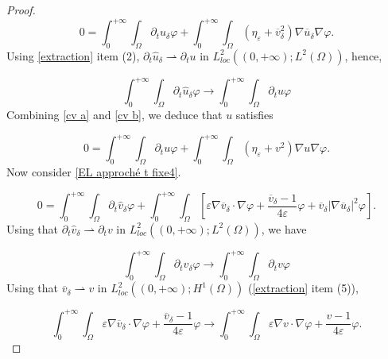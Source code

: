 \documentclass[reqno,12pt,twoside]{amsart}
\numberwithin{equation}{section} \numberwithin{theorem}{section}
\numberwithin{proposition}{section} \numberwithin{lemma}{section}
\numberwithin{corollary}{section}
\numberwithin{definition}{section} \numberwithin{remark}{section}
\begin{document}
\begin{proof}
\[0 =\int_0^{+\infty} \int_\Omega \partial_t \hat{u}_\delta \varphi + \int_0^{+\infty}\int_\Omega (\eta_\varepsilon + \overline{v}_\delta ^2) \nabla \overline{u}_\delta \nabla \varphi.\]
Using \autoref{extraction} item (2), $\partial_t \hat{u}_\delta \rightharpoonup \partial_t u$ in $L_{loc}^2((0,+\infty);L^2(\Omega))$, hence,

\begin{equation}\label{cv a}
\int_0^{+\infty} \int_\Omega \partial_t \hat{u}_\delta \varphi \rightarrow \int_0^{+\infty} \int_\Omega \partial_t u \varphi
\end{equation}
Combining \eqref{cv a} and \eqref{cv b}, we deduce that $u$ satisfies 

\begin{equation}\label{cv 1}
0 = \int_0^{+\infty} \int_\Omega \partial_t u \varphi + \int_0^{+\infty}\int_\Omega (\eta_\varepsilon + v ^2) \nabla u \nabla \varphi.
\end{equation}
Now consider \eqref{EL approché t fixe4}.

\[0 = \int_0^{+\infty} \int_\Omega \partial_t \hat{v}_\delta \varphi + \int_0^{+\infty} \int_\Omega \left[\varepsilon \nabla \overline{v}_\delta \cdot \nabla \varphi + \frac{\overline{v}_\delta -1}{4\varepsilon} \varphi + \overline{v}_\delta |\nabla \overline{u}_\delta |^2 \varphi\right].\]
Using that $ \partial_t \hat{v}_\delta \rightharpoonup \partial_t v$ in $L_{loc}^2((0,+\infty);L^2(\Omega))$, we have 

\begin{equation}\label{cv c}
\int_0^{+\infty} \int_\Omega \partial_t \hat{v}_\delta \varphi \rightarrow \int_0^{+\infty} \int_\Omega \partial_t v \varphi
\end{equation}
Using that  $\overline{v}_\delta \rightharpoonup  v$ in $L_{loc}^2((0,+\infty);H^1(\Omega))$ (\autoref{extraction} item (5)), 

\begin{equation}\label{cv d}
\int_0^{+\infty} \int_\Omega \varepsilon \nabla \overline{v}_\delta \cdot \nabla \varphi + \frac{\overline{v}_\delta -1}{4\varepsilon} \varphi \rightarrow \int_0^{+\infty} \int_\Omega \varepsilon \nabla v \cdot \nabla \varphi + \frac{v -1}{4\varepsilon} \varphi.
\end{equation}


\end{proof}
\end{document}
